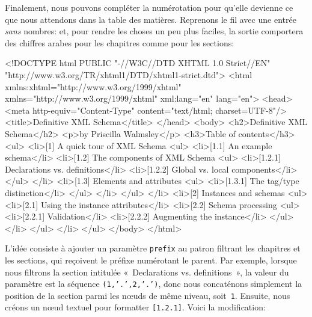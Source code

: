 Finalement, nous pouvons compléter la numérotation pour qu'elle
devienne ce que nous attendons dans la table des matières. Reprenons
le fil avec une entrée \emph{sans} nombres:
\noindent et, pour rendre les choses un peu plus faciles, la sortie
comportera des chiffres arabes pour les chapitres comme pour les sections:
\begin{sverb}
<!DOCTYPE html
  PUBLIC "-//W3C//DTD XHTML 1.0 Strict//EN"
         "http://www.w3.org/TR/xhtml1/DTD/xhtml1-strict.dtd">
<html xmlns:xhtml="http://www.w3.org/1999/xhtml"
      xmlns="http://www.w3.org/1999/xhtml"
      xml:lang="en" lang="en">
  <head><meta http-equiv="Content-Type"
              content="text/html; charset=UTF-8"/>
        <title>Definitive XML Schema</title>
  </head>
  <body>
    <h2>Definitive XML Schema</h2>
    <p>by Priscilla Walmsley</p>
    <h3>Table of contents</h3>
    <ul>
      <li>[1] A quick tour of XML Schema
        <ul>
          <li>[1.1] An example schema</li>
          <li>[1.2] The components of XML Schema
            <ul>
              <li>[1.2.1] Declarations vs. definitions</li>
              <li>[1.2.2] Global vs. local components</li>
            </ul>
          </li>
          <li>[1.3] Elements and attributes
            <ul>
              <li>[1.3.1] The tag/type distinction</li>
            </ul>
          </li>
        </ul>
      </li>
      <li>[2] Instances and schemas
        <ul>
          <li>[2.1] Using the instance attributes</li>
          <li>[2.2] Schema processing
            <ul>
              <li>[2.2.1] Validation</li>
              <li>[2.2.2] Augmenting the instance</li>
            </ul>
          </li>
        </ul>
      </li>
    </ul>
  </body>
</html>
\end{sverb}
L'idée consiste à ajouter un paramètre \texttt{prefix} au patron
filtrant les chapitres et les sections, qui reçoivent le préfixe
numérotant le parent. Par exemple, lorsque nous filtrons la section
intitulée «~Declarations vs. definitions~», la valeur du paramètre est
la séquence \texttt{(1,'.',2,'.')}, donc nous concaténons simplement
la position de la section parmi les n{\oe}uds de même niveau,
soit~\texttt{1}. Ensuite, nous créons un n{\oe}ud textuel pour
formatter \texttt{[1.2.1]}. Voici la modification:
